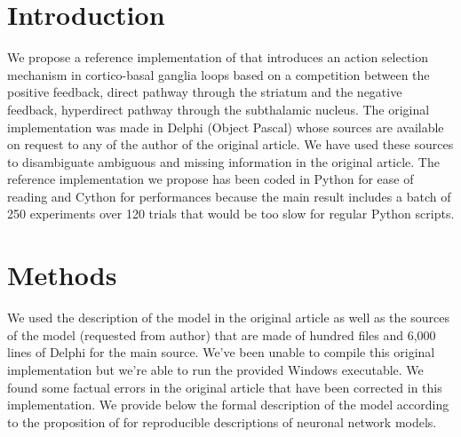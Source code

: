 \section*{Introduction}

We propose a reference implementation of \citep{Guthrie:2013} that introduces an
action selection mechanism in cortico-basal ganglia loops based on a
competition between the positive feedback, direct pathway through the striatum
and the negative feedback, hyperdirect pathway through the subthalamic
nucleus. The original implementation was made in Delphi (Object Pascal) whose
sources are available on request to any of the author of the original
article. We have used these sources to disambiguate ambiguous and missing
information in the original article. The reference implementation we propose
has been coded in Python for ease of reading and Cython for performances
because the main result includes a batch of 250 experiments over 120 trials
that would be too slow for regular Python scripts.


\section*{Methods}

We used the description of the model in the original article as well as the
sources of the model (requested from author) that are made of hundred files and
6,000 lines of Delphi for the main source. We've been unable to compile this
original implementation but we're able to run the provided Windows executable.
We found some factual errors in the original article that have been corrected
in this implementation. We provide below the formal description of the model
according to the proposition of \cite{Nordlie:2009} for reproducible
descriptions of neuronal network models.

